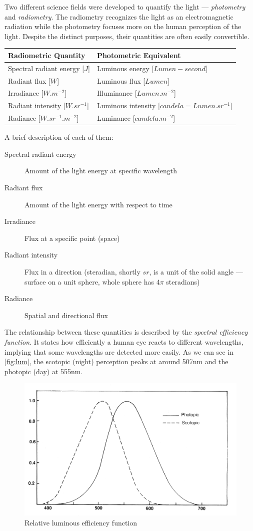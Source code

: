 Two different science fields were developed to quantify the light --- \emph{photometry} and \emph{radiometry}. The radiometry recognizes the light as an electromagnetic radiation while the photometry focuses more on the human perception of the light. Despite the distinct purposes, their quantities are often easily convertible.

\begin{tabular}{ll}
	\hline
	\textbf{Radiometric Quantity} & \textbf{Photometric Equivalent} \\
	\hline \hline
	Spectral radiant energy [$J$] & Luminous energy [$Lumen-second$] \\
	\hline
	Radiant flux [$W$] & Luminous flux [$Lumen$] \\
	\hline
	Irradiance [$W.m^{-2}$] & Illuminance [$Lumen.m^{-2}$]  \\
	\hline
	Radiant intensity [$W.sr^{-1}$] & Luminous intensity [$candela=Lumen.sr^{-1}$] \\
	\hline
	Radiance [$W.sr^{-1}.m^{-2}$] & Luminance [$candela.m^{-2}$]
\end{tabular}
\bigbreak
A brief description of each of them:
\begin{description}
	\item[Spectral radiant energy] Amount of the light energy at specific wavelength
	\item[Radiant flux] Amount of the light energy with respect to time
	\item[Irradiance] Flux at a specific point (space)
	\item[Radiant intensity] Flux in a direction (steradian, shortly $sr$, is a unit of the solid angle --- surface on a unit sphere, whole sphere has $4\pi$ steradians)
	\item[Radiance] Spatial and directional flux
\end{description}

The relationship between these quantities is described by the \emph{spectral efficiency function}. It states how efficiently a human eye reacts to different wavelengths, implying that some wavelengths are detected more easily. As we can see in \autoref{fig:lum}, the scotopic (night) perception peaks at around 507nm and the photopic (day) at 555nm.

\begin{figure}[h]
	\centering
	\includegraphics[width=0.8\linewidth]{img/luminous_efficiency.png}
	\caption{Relative luminous efficiency function~\cite{colorScienceSlides}}
	\label{fig:lum}
\end{figure}

